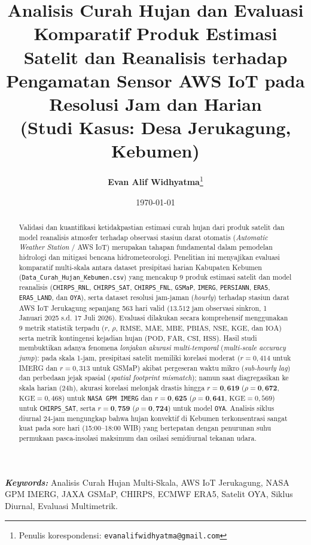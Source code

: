 \documentclass[11pt,a4paper]{article}
\title{\vspace{-1.2cm}\textbf{\Large Analisis Curah Hujan dan Evaluasi Komparatif Produk Estimasi Satelit dan Reanalisis terhadap Pengamatan Sensor AWS IoT pada Resolusi Jam dan Harian \\ (Studi Kasus: Desa Jerukagung, Kebumen)}}
\author[1]{\textbf{Evan Alif Widhyatma}\thanks{Penulis korespondensi: \texttt{evanalifwidhyatma@gmail.com}}}
\affil[1]{\small Program Studi Sains Data, Fakultas Sains dan Teknologi, Universitas Putra Bangsa, Kebumen, Jawa Tengah, Indonesia}
\date{\small\today}
\begin{document}
\maketitle

\begin{abstract}
\noindent Validasi dan kuantifikasi ketidakpastian estimasi curah hujan dari produk satelit dan model reanalisis atmosfer terhadap observasi stasiun darat otomatis (\textit{Automatic Weather Station} / AWS IoT) merupakan tahapan fundamental dalam pemodelan hidrologi dan mitigasi bencana hidrometeorologi. Penelitian ini menyajikan evaluasi komparatif multi-skala antara dataset presipitasi harian Kabupaten Kebumen (\texttt{Data\_Curah\_Hujan\_Kebumen.csv}) yang mencakup 9 produk estimasi satelit dan model reanalisis (\texttt{CHIRPS\_RNL}, \texttt{CHIRPS\_SAT}, \texttt{CHIRPS\_FNL}, \texttt{GSMaP}, \texttt{IMERG}, \texttt{PERSIANN}, \texttt{ERA5}, \texttt{ERA5\_LAND}, dan \texttt{OYA}), serta dataset resolusi jam-jaman (\textit{hourly}) terhadap stasiun darat AWS IoT Jerukagung sepanjang 563 hari valid ($13.512$ jam observasi sinkron, 1 Januari 2025 s.d. 17 Juli 2026). Evaluasi dilakukan secara komprehensif menggunakan 9 metrik statistik terpadu ($r$, $\rho$, $\text{RMSE}$, $\text{MAE}$, $\text{MBE}$, $\text{PBIAS}$, $\text{NSE}$, $\text{KGE}$, dan $\text{IOA}$) serta metrik kontingensi kejadian hujan ($\text{POD}$, $\text{FAR}$, $\text{CSI}$, $\text{HSS}$). Hasil studi membuktikan adanya fenomena \textit{lonjakan akurasi multi-temporal} (\textit{multi-scale accuracy jump}): pada skala 1-jam, presipitasi satelit memiliki korelasi moderat ($r = 0{,}414$ untuk IMERG dan $r = 0{,}313$ untuk GSMaP) akibat pergeseran waktu mikro (\textit{sub-hourly lag}) dan perbedaan jejak spasial (\textit{spatial footprint mismatch}); namun saat diagregasikan ke skala harian ($24\text{h}$), akurasi korelasi melonjak drastis hingga $r = \mathbf{0{,}619}$ ($\rho = \mathbf{0{,}672}$, $\text{KGE} = 0{,}468$) untuk \texttt{NASA GPM IMERG} dan $r = \mathbf{0{,}625}$ ($\rho = \mathbf{0{,}641}$, $\text{KGE} = 0{,}569$) untuk \texttt{CHIRPS\_SAT}, serta $r = \mathbf{0{,}759}$ ($\rho = \mathbf{0{,}724}$) untuk model \texttt{OYA}. Analisis siklus diurnal 24-jam mengungkap bahwa hujan konvektif di Kebumen terkonsentrasi sangat kuat pada sore hari (15:00--18:00 WIB) yang bertepatan dengan penurunan suhu permukaan pasca-insolasi maksimum dan osilasi semidiurnal tekanan udara.
\end{abstract}

\vspace{0.2cm}
\noindent\textbf{\textit{Keywords:}} Analisis Curah Hujan Multi-Skala, AWS IoT Jerukagung, NASA GPM IMERG, JAXA GSMaP, CHIRPS, ECMWF ERA5, Satelit OYA, Siklus Diurnal, Evaluasi Multimetrik.
\end{document}
